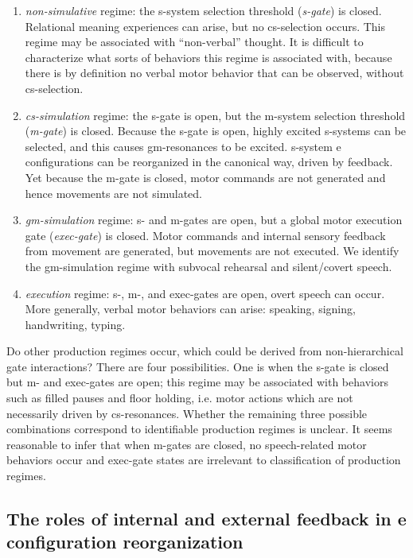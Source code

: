 \begin{enumerate}
\item \textit{non-simulative} regime: the s-system selection threshold (\textit{s-gate}) is closed. Relational meaning experiences can arise, but no cs-selection occurs. This regime may be associated with “non-verbal” thought. It is difficult to characterize what sorts of behaviors this regime is associated with, because there is by definition no verbal motor behavior that can be observed, without cs-selection. 

\item \textit{cs-simulation} regime: the s-gate is open, but the m-system selection threshold (\textit{m-gate}) is closed. Because the s-gate is open, highly excited s-systems can be selected, and this causes gm-resonances to be excited. s-system e configurations can be reorganized in the canonical way, driven by feedback. Yet because the m-gate is closed, motor commands are not generated and hence movements are not simulated. 

\item \textit{gm-simulation} regime: s- and m-gates are open,  but a global motor execution gate (\textit{exec-gate}) is closed. Motor commands and internal sensory feedback from movement are generated, but movements are not executed. We identify the gm-simulation regime with subvocal rehearsal and silent/covert speech. 

\item \textit{execution} regime: s-, m-, and exec-gates are open, overt speech can occur. More generally, verbal motor behaviors can arise: speaking, signing, handwriting, typing.
\end{enumerate}

  Do other production regimes occur, which could  be derived from non-hierarchical gate interactions? There are four possibilities. One is when the s-gate is closed but m- and exec-gates are open; this regime may be associated with behaviors such as filled pauses and floor holding, i.e. motor actions which are not necessarily driven by cs-resonances. Whether the remaining three possible combinations correspond to identifiable production regimes is unclear. It seems reasonable to infer that when m-gates are closed, no speech-related motor behaviors occur and exec-gate states are irrelevant to classification of production regimes.

\subsection{The roles of internal and external feedback in e configuration reorganization}

